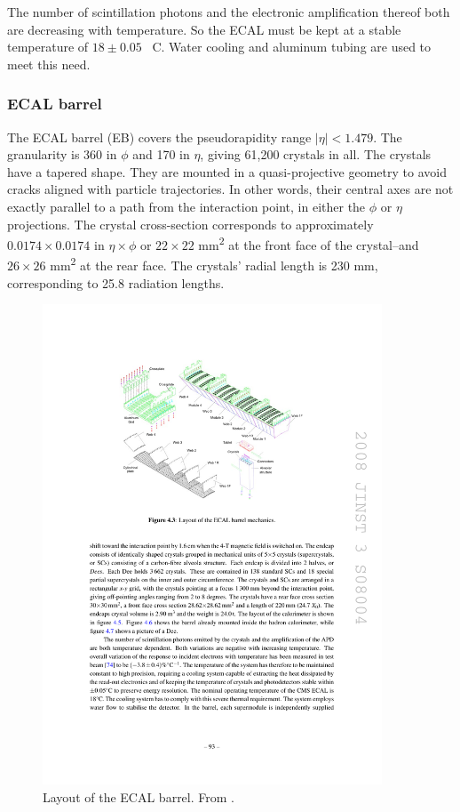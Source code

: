 The number of scintillation photons and the electronic amplification thereof both are decreasing with temperature. 
So the ECAL must be kept at a stable temperature of $18\pm0.05$\textdegree~ C.
Water cooling and aluminum tubing are used to meet this need.

\subsubsection{ECAL barrel}
The ECAL barrel (EB) covers the pseudorapidity range $|\eta|<1.479$.
The granularity is 360 in $\phi$ and 170 in $\eta$, giving 61,200 crystals in all.
The crystals have a tapered shape.
They are mounted in a quasi-projective geometry to avoid cracks aligned with particle trajectories.
In other words, their central axes are not exactly parallel to a path from the interaction point, 
in either the $\phi$ or $\eta$ projections.
The crystal cross-section corresponds to approximately $0.0174 \times 0.0174$ in $\eta\times\phi$
or $22 \times 22$ mm\textsuperscript{2} at the front face of the crystal--and $26 \times 26$ mm\textsuperscript{2}
at the rear face.
The crystals' radial length is 230 mm, corresponding to 25.8 radiation lengths.

\begin{figure}
\centering
\includegraphics[width=0.9\textwidth]{figures/ecal_barrel.pdf}
\caption{Layout of the ECAL barrel. From \cite{Chatrchyan:2008aa}.}
\label{fig:ecal_barrel}
\end{figure}

